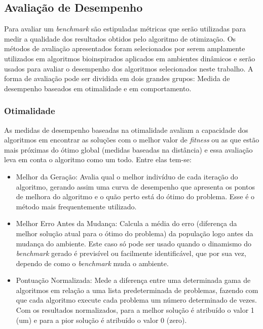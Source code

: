 \subsection{Avaliação de Desempenho}
\label{sec:perfermance_measures}

Para avaliar um \textit{benchmark} são estipuladas métricas que serão utilizadas para medir a qualidade dos resultados obtidos pelo algoritmo de otimização. Os métodos de avaliação apresentados foram selecionados por serem amplamente utilizados em algoritmos bioinspirados aplicados em ambientes dinâmicos e serão usados para avaliar o desempenho dos algoritmos selecionados neste trabalho.
A forma de avaliação pode ser dividida em dois grandes grupos: Medida de desempenho baseados em otimalidade e em comportamento.

\subsubsection{Otimalidade}
As medidas de desempenho baseadas na otimalidade avaliam a capacidade dos algoritmos em encontrar as soluções com o melhor valor de \textit{fitness} ou as que estão mais próximas do ótimo global (medidas baseadas na distância) e essa avaliação leva em conta o algoritmo como um todo. Entre elas tem-se:

\begin{itemize}
\item Melhor da Geração: Avalia qual o melhor indivíduo de cada iteração do algoritmo, gerando assim uma curva de desempenho que apresenta os pontos de melhora do algoritmo e o quão perto está do ótimo do problema. Esse é o método mais frequentemente utilizado.

\item Melhor Erro Antes da Mudança: Calcula a média do erro (diferença da melhor solução atual para o ótimo do problema) da população logo antes da mudança do ambiente. Este caso só pode ser usado quando o dinamismo do \textit{benchmark} gerado é previsível ou facilmente identificável, que por sua vez, dependo de como o \textit{benchmark} muda o ambiente.

\item Pontuação Normalizada: Mede a diferença entre uma determinada gama de algoritmos em relação a uma lista predeterminada de problemas, fazendo com que cada algoritmo execute cada problema um número determinado de vezes. Com os resultados normalizados, para a melhor solução é atribuído o valor 1 (um) e para a pior solução é atribuído o valor 0 (zero).
\end{itemize}


